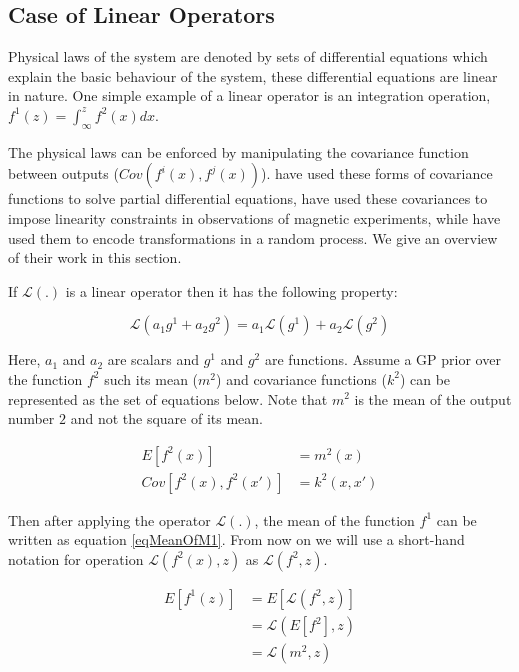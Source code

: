 \subsection{Case of Linear Operators}\label{subsecLinearOperators}
Physical laws of the system are denoted by sets of differential equations which explain the basic behaviour of the system, these differential equations are linear in nature. One simple example of a linear operator is an integration operation, $f^1(z) = \int_{\infty}^z f^2(x)dx$. 

The physical laws can be enforced by manipulating the covariance function between outputs ($Cov(f^i(x), f^j(x))$). \cite{journals/jmlr/AlvarezLL09, sarkka2011linear} have used these forms of covariance functions to solve partial differential equations, \cite{jidling2017linearly} have used these covariances to impose linearity constraints in observations of magnetic experiments, while \cite{ginsbourger2013invariances} have used them to encode transformations in a random process. We give an overview of their work in this section. 

If $\mathcal{L} (.)$ is a linear operator then it has the following property:

\begin{equation}
    \mathcal{L} (a_1g^1 + a_2g^2) = a_1\mathcal{L}(g^1) + a_2\mathcal{L}(g^2) 
\end{equation}

Here, $a_1$ and $a_2$ are scalars and $g^1$ and $g^2$ are functions. Assume a GP prior over the function $f^2$ such its mean ($m^2$) and covariance functions ($k^2$) can be represented as the set of equations below. Note that $m^2$ is the mean of the output number $2$ and not the square of its mean.

\begin{align}
E[f^2(x)] & = m^2(x) \\
Cov[f^2(x), f^2(x')] & = k^2(x, x')
\end{align}

Then after applying the operator $\mathcal{L}(.)$, the mean of the function $f^1$ can be written as equation \ref{eqMeanOfM1}. From now on we will use a short-hand notation for operation $\mathcal{L}\left ( f^{2}(x), z \right )$ as $\mathcal{L}\left ( f^{2}, z \right )$.

\begin{equation}\label{eqMeanOfM1}
\begin{aligned}
E[f^1(z)]   & = E[\mathcal{L}\left ( f^{2}, z \right )] \\
            & = \mathcal{L}(E[f^{2}], z) \\
            & = \mathcal{L}(m^2, z)
\end{aligned}
\end{equation}

